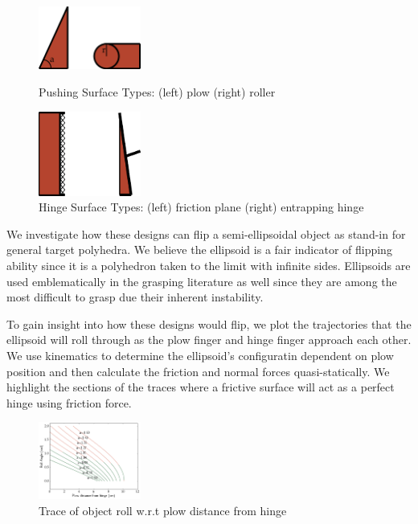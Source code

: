 \documentclass[runningheads,a4paper]{llncs}
\begin{document}
\begin{figure}[!tbp]
  \centering
  \begin{minipage}[b]{0.4\textwidth}
    \includegraphics[width=0.3\textwidth]{PlowSurfaceTypes.eps}
    \caption{\label{fig:psurfaces}Pushing Surface Types: (left) plow (right) roller}
  \end{minipage}
  \hfill
  \begin{minipage}[b]{0.4\textwidth}
    \includegraphics[width=0.3\textwidth]{HingeSurfaceTypes.eps}
    \caption{\label{fig:surfacesh}Hinge Surface Types: (left) friction plane (right) entrapping hinge}
  \end{minipage}
\end{figure}

We investigate how these designs can flip a semi-ellipsoidal object as stand-in for general target polyhedra.
We believe the ellipsoid is a fair indicator of flipping ability since it is a polyhedron taken to the limit with infinite sides.
Ellipsoids are used emblematically in the grasping literature as well since they are among the most difficult to grasp due their inherent instability.

To gain insight into how these designs would flip, we plot the trajectories that the ellipsoid will roll through as the plow finger and hinge finger approach each other.
We use kinematics to determine the ellipsoid's configuratin dependent on plow position and then calculate the friction and normal forces quasi-statically.
We highlight the sections of the traces where a frictive surface will act as a perfect hinge using friction force.

\begin{figure}[h!]
\centering
\includegraphics[width=0.3\textwidth]{PlowFlipTrace.png}
\caption{\label{fig:plow}Trace of object roll w.r.t plow distance from hinge}
\end{figure}
\end{document}
